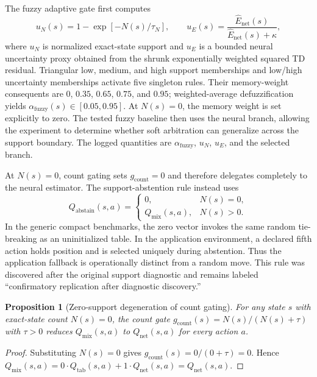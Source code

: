 \documentclass[preprint,12pt]{elsarticle}
\newtheorem{proposition}{Proposition}
\begin{document}
The fuzzy adaptive gate first computes
\begin{equation}
u_N(s)=1-\exp[-N(s)/\tau_N],
\qquad
u_E(s)=\frac{\widehat{E}_{\mathrm{net}}(s)}
{\widehat{E}_{\mathrm{net}}(s)+\kappa},
\end{equation}
where $u_N$ is normalized exact-state support and $u_E$ is a bounded neural
uncertainty proxy obtained from the shrunk exponentially weighted squared TD
residual. Triangular low, medium, and high support memberships and low/high
uncertainty memberships activate five singleton rules. Their memory-weight
consequents are $0$, $0.35$, $0.65$, $0.75$, and $0.95$; weighted-average
defuzzification yields $\alpha_{\mathrm{fuzzy}}(s)\in[0.05,0.95]$. At
$N(s)=0$, the memory weight is set explicitly to zero. The tested fuzzy
baseline then uses the neural branch, allowing the experiment to determine
whether soft arbitration can generalize across the support boundary. The
logged quantities are $\alpha_{\mathrm{fuzzy}}$, $u_N$, $u_E$, and the
selected branch.

At $N(s)=0$, count gating sets $g_{\mathrm{count}}=0$ and therefore delegates
completely to the neural estimator. The support-abstention rule instead uses
\begin{equation}
Q_{\mathrm{abstain}}(s,a)=
\begin{cases}
0, & N(s)=0,\\
Q_{\mathrm{mix}}(s,a), & N(s)>0.
\end{cases}
\end{equation}
In the generic compact benchmarks, the zero vector invokes the same random
tie-breaking as an uninitialized table. In the application environment, a
declared fifth action holds position and is selected uniquely during
abstention. Thus the application fallback is operationally distinct from a
random move. This rule was discovered after the original support diagnostic
and remains labeled ``confirmatory replication after diagnostic discovery.''

\begin{proposition}[Zero-support degeneration of count gating]
For any state $s$ with exact-state count $N(s)=0$, the count gate
$g_{\mathrm{count}}(s)=N(s)/(N(s)+\tau)$ with $\tau>0$ reduces
$Q_{\mathrm{mix}}(s,a)$ to $Q_{\mathrm{net}}(s,a)$ for every action $a$.
\end{proposition}
\begin{proof}
Substituting $N(s)=0$ gives $g_{\mathrm{count}}(s)=0/(0+\tau)=0$. Hence
$Q_{\mathrm{mix}}(s,a)=0\cdot Q_{\mathrm{tab}}(s,a)+1\cdot
Q_{\mathrm{net}}(s,a)=Q_{\mathrm{net}}(s,a)$.
\end{proof}
\end{document}
